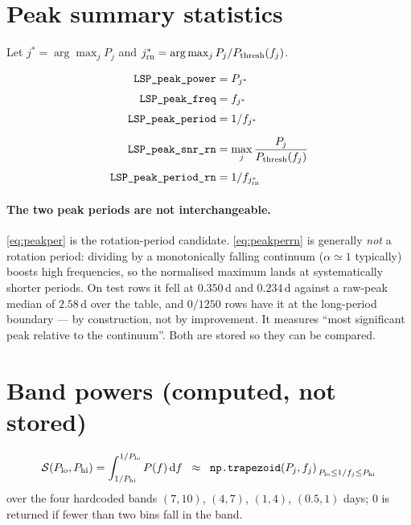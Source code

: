 \documentclass[11pt]{article}
\newcommand{\dd}{\,\mathrm{d}}
\begin{document}
\section{Peak summary statistics}

Let $j^{\ast} = \arg\max_j P_j$ and $j^{\ast}_{\rm rn} = \arg\max_j P_j/P_{\rm thresh}(f_j)$.

\begin{align}
  \texttt{LSP\_peak\_power}  &= P_{j^{\ast}}
  \label{eq:peakpow}\\[3pt]
  \texttt{LSP\_peak\_freq}   &= f_{j^{\ast}}
  \label{eq:peakfreq}\\[3pt]
  \texttt{LSP\_peak\_period} &= 1/f_{j^{\ast}}
  \label{eq:peakper}\\[6pt]
  \texttt{LSP\_peak\_snr\_rn}    &= \max_j \frac{P_j}{P_{\rm thresh}(f_j)}
  \label{eq:peakrn}\\[3pt]
  \texttt{LSP\_peak\_period\_rn} &= 1/f_{j^{\ast}_{\rm rn}}
  \label{eq:peakperrn}
\end{align}

\paragraph{The two peak periods are not interchangeable.}
\eqref{eq:peakper} is the rotation-period candidate. \eqref{eq:peakperrn} is generally
\emph{not} a rotation period: dividing by a monotonically falling continuum
($\alpha \simeq 1$ typically) boosts high frequencies, so the normalised maximum lands at
systematically shorter periods. On test rows it fell at $0.350$\,d and $0.234$\,d against
a raw-peak median of $2.58$\,d over the table, and $0/1250$ rows have it at the
long-period boundary --- by construction, not by improvement. It measures ``most
significant peak relative to the continuum''. Both are stored so they can be compared.

\section{Band powers (computed, not stored)}

\begin{equation}
  \mathcal{S}(P_{\rm lo}, P_{\rm hi})
    = \int_{1/P_{\rm hi}}^{1/P_{\rm lo}} P(f) \dd f
    \;\;\approx\;\; \texttt{np.trapezoid}\!\left(P_j, f_j\right)_{\,P_{\rm lo} \le 1/f_j \le P_{\rm hi}}
  \label{eq:band}
\end{equation}
%
over the four hardcoded bands $(7,10)$, $(4,7)$, $(1,4)$, $(0.5,1)$ days; $0$ is returned
if fewer than two bins fall in the band.
\end{document}
